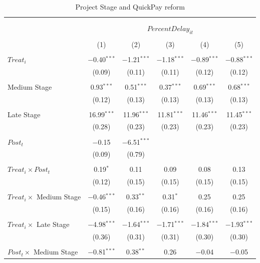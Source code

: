 \documentclass[
]{article}
\begin{document}
\begin{table}[H] \centering 
  \caption{Project Stage and QuickPay reform} 
  \label{} 
\small 
\begin{tabular}{@{\extracolsep{-2pt}}lccccc} 
\\[-1.8ex]\hline 
\hline \\[-1.8ex] 
\\[-1.8ex] & \multicolumn{5}{c}{$PercentDelay_{it}$  } \\ 
\\[-1.8ex] & (1) & (2) & (3) & (4) & (5)\\ 
\hline \\[-1.8ex] 
 $Treat_i$ & $-$0.40$^{***}$ & $-$1.21$^{***}$ & $-$1.18$^{***}$ & $-$0.89$^{***}$ & $-$0.88$^{***}$ \\ 
  & (0.09) & (0.11) & (0.11) & (0.12) & (0.12) \\ 
  & & & & & \\ 
 Medium Stage & 0.93$^{***}$ & 0.51$^{***}$ & 0.37$^{***}$ & 0.69$^{***}$ & 0.68$^{***}$ \\ 
  & (0.12) & (0.13) & (0.13) & (0.13) & (0.13) \\ 
  & & & & & \\ 
 Late Stage & 16.99$^{***}$ & 11.96$^{***}$ & 11.81$^{***}$ & 11.46$^{***}$ & 11.45$^{***}$ \\ 
  & (0.28) & (0.23) & (0.23) & (0.23) & (0.23) \\ 
  & & & & & \\ 
 $Post_t$ & $-$0.15 & $-$6.51$^{***}$ &  &  &  \\ 
  & (0.09) & (0.79) &  &  &  \\ 
  & & & & & \\ 
 $Treat_i \times Post_t$ & 0.19$^{*}$ & 0.11 & 0.09 & 0.08 & 0.13 \\ 
  & (0.12) & (0.15) & (0.15) & (0.15) & (0.15) \\ 
  & & & & & \\ 
 $Treat_i \times$ Medium Stage & $-$0.46$^{***}$ & 0.33$^{**}$ & 0.31$^{*}$ & 0.25 & 0.25 \\ 
  & (0.15) & (0.16) & (0.16) & (0.16) & (0.16) \\ 
  & & & & & \\ 
 $Treat_i \times$ Late Stage & $-$4.98$^{***}$ & $-$1.64$^{***}$ & $-$1.71$^{***}$ & $-$1.84$^{***}$ & $-$1.93$^{***}$ \\ 
  & (0.36) & (0.31) & (0.31) & (0.30) & (0.30) \\ 
  & & & & & \\ 
 $Post_t \times$ Medium Stage & $-$0.81$^{***}$ & 0.38$^{**}$ & 0.26 & $-$0.04 & $-$0.05 \\ 

\end{tabular}
\end{table}
\end{document}
